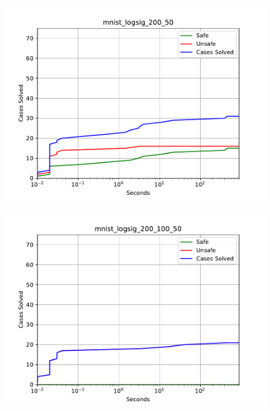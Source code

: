 \begin{figure}[!ht]
\center
\includegraphics[scale=0.8]{figures/mnist_logsig_200_50.pdf}
\end{figure}

\begin{figure}[!ht]
\center
\includegraphics[scale=0.8]{figures/mnist_logsig_200_100_50.pdf}
\end{figure}

